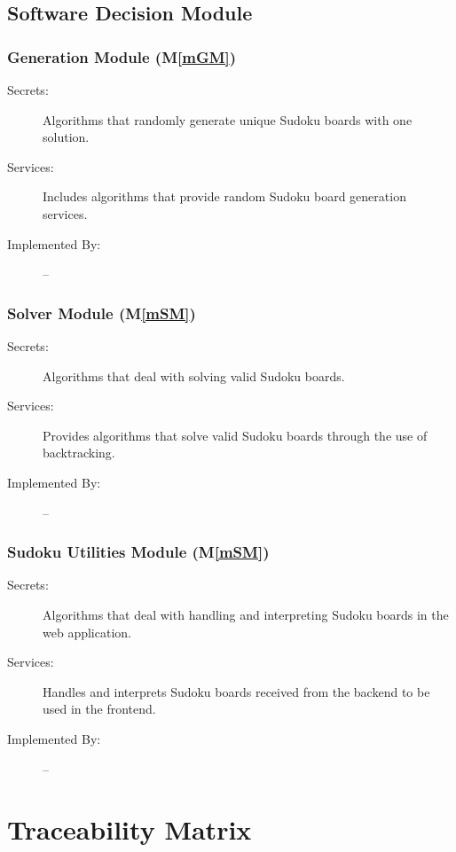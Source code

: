 \documentclass[12pt, titlepage]{article}
\newcommand{\mref}[1]{M\ref{#1}}
\begin{document}
\subsection{Software Decision Module}

\subsubsection{Generation Module (\mref{mGM})}

\begin{description}
\item[Secrets:] Algorithms that randomly generate unique Sudoku boards with one solution.
\item[Services:] Includes algorithms that provide random Sudoku board generation services.
\item[Implemented By:] --
\end{description}

\subsubsection{Solver Module (\mref{mSM})}

\begin{description}
\item[Secrets:] Algorithms that deal with solving valid Sudoku boards.
\item[Services:] Provides algorithms that solve valid Sudoku boards through the use of backtracking.
\item[Implemented By:] --
\end{description}

\subsubsection{Sudoku Utilities Module (\mref{mSM})}

\begin{description}
\item[Secrets:] Algorithms that deal with handling and interpreting Sudoku boards in the web application.
\item[Services:] Handles and interprets Sudoku boards received from the backend to be used in the frontend.
\item[Implemented By:] --
\end{description}

\section{Traceability Matrix} \label{SecTM}
\end{document}
